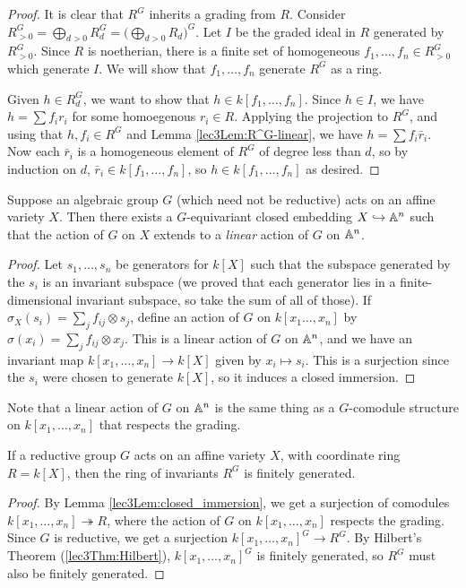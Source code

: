 \begin{proof}
 It is clear that $R^G$ inherits a grading from $R$. Consider $R^G_{>0} = \bigoplus_{d>0}R^G_d=\bigl(\bigoplus_{d>0}R_d)^G$. Let $I$ be the graded ideal in $R$ generated by $R_{>0}^G$. Since $R$ is noetherian, there is a finite set of homogeneous $f_1,\dots, f_n\in R_{>0}^G$ which generate $I$. We will show that $f_1,\dots, f_n$ generate $R^G$ as a ring.
   
 Given $h\in R^G_d$, we want to show that $h\in k[f_1,\dots, f_n]$. Since $h\in I$, we have $h=\sum f_i r_i$ for some homoegenous $r_i\in R$. Applying the projection to $R^G$, and using that $h,f_i\in R^G$ and Lemma \ref{lec3Lem:R^G-linear}, we have $h=\sum f_i\bar r_i$. Now each $\bar r_i$ is a homogeneous element of $R^G$ of degree less than $d$, so by induction on $d$, $\bar r_i\in k[f_1,\dots, f_n]$, so $h\in k[f_1,\dots, f_n]$ as desired.
\end{proof}
\begin{lemma}\label{lec3Lem:closed_immersion}
 Suppose an algebraic group $G$ (which need not be reductive) acts on an affine variety $X$. Then there exists a $G$-equivariant closed embedding $X\hookrightarrow \AA^n$ such that the action of $G$ on $X$ extends to a \emph{linear} action of $G$ on $\AA^n$.
\end{lemma}
\begin{proof}
 Let $s_1,\dots, s_n$ be generators for $k[X]$ such that the subspace generated by the $s_i$ is an invariant subspace (we proved that each generator lies in a finite-dimensional invariant subspace, so take the sum of all of those). If $\sigma_X(s_i)=\sum_j f_{ij}\otimes s_j$, define an action of $G$ on $k[x_1\dots, x_n]$ by $\sigma(x_i)=\sum_j f_{ij}\otimes x_j$. This is a linear action of $G$ on $\AA^n$, and we have an invariant map $k[x_1,\dots, x_n]\to k[X]$ given by $x_i\mapsto s_i$. This is a surjection since the $s_i$ were chosen to generate $k[X]$, so it induces a closed immersion.
\end{proof}
\begin{remark}
 Note that a linear action of $G$ on $\AA^n$ is the same thing as a $G$-comodule structure on $k[x_1,\dots, x_n]$ that respects the grading.
\end{remark}
\begin{corollary}\label{lec3Cor:Hilbert}
 If a reductive group $G$ acts on an affine variety $X$, with coordinate ring $R=k[X]$, then the ring of invariants $R^G$ is finitely generated.
\end{corollary}
\begin{proof}
 By Lemma \ref{lec3Lem:closed_immersion}, we get a surjection of comodules $k[x_1,\dots, x_n]\twoheadrightarrow R$, where the action of $G$ on $k[x_1,\dots, x_n]$ respects the grading. Since $G$ is reductive, we get a surjection $k[x_1,\dots, x_n]^G\to R^G$. By Hilbert's Theorem (\ref{lec3Thm:Hilbert}), $k[x_1,\dots, x_n]^G$ is finitely generated, so $R^G$ must also be finitely generated.
\end{proof}

